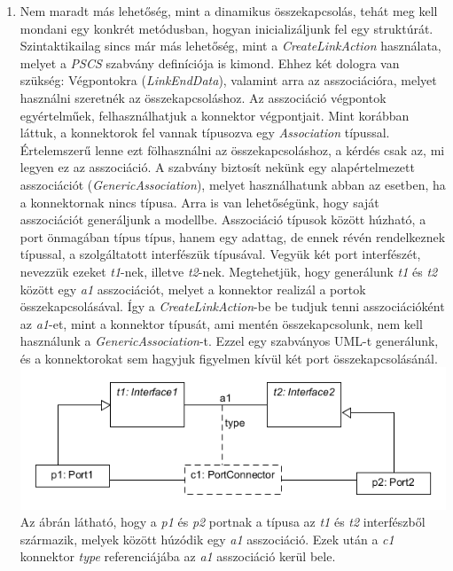 \documentclass[a4paper,12pt]{report}
\begin{document}
\begin{enumerate}
\item Nem maradt más lehetőség, mint a dinamikus összekapcsolás, tehát meg kell mondani egy konkrét metódusban, hogyan inicializáljunk fel egy struktúrát. Szintaktikailag sincs már más lehetőség, mint a \textit{CreateLinkAction} használata, melyet a \textit{PSCS} szabvány definíciója is kimond. Ehhez két dologra van szükség: Végpontokra (\textit{LinkEndData}), valamint arra az asszociációra, melyet használni szeretnék az összekapcsoláshoz. Az asszociáció végpontok egyértelműek, felhasználhatjuk a konnektor végpontjait. Mint korábban láttuk, a konnektorok fel vannak típusozva egy \textit{Association} típussal. Értelemszerű lenne ezt fölhasználni az összekapcsoláshoz, a kérdés csak az, mi legyen ez az asszociáció. A szabvány biztosít nekünk egy alapértelmezett asszociációt (\textit{GenericAssociation}), melyet használhatunk abban az esetben, ha a konnektornak nincs típusa. Arra is van lehetőségünk, hogy saját asszociációt generáljunk a modellbe. Asszociáció típusok között húzható, a port önmagában típus típus, hanem egy adattag, de ennek révén rendelkeznek típussal, a szolgáltatott interfészük típusával. Vegyük két port interfészét, nevezzük ezeket \textit{t1}-nek, illetve \textit{t2}-nek.  Megtehetjük, hogy generálunk \textit{t1} és \textit{t2} között egy \textit{a1} asszociációt, melyet a konnektor realizál a portok összekapcsolásával. Így a \textit{CreateLinkAction}-be be tudjuk tenni asszociációként az \textit{a1}-et, mint a konnektor típusát, ami mentén összekapcsolunk, nem kell használunk a \textit{GenericAssociation}-t. Ezzel egy szabványos UML-t generálunk, és a konnektorokat sem hagyjuk figyelmen kívül két port összekapcsolásánál. \\
\includegraphics[scale=0.8]{connect_type.png}
Az ábrán látható, hogy a \textit{p1} és \textit{p2} portnak a típusa az \textit{t1} és \textit{t2} interfészből származik, melyek között húzódik egy \textit{a1} asszociáció. Ezek után a \textit{c1} konnektor \textit{type} referenciájába az \textit{a1} asszociáció kerül bele. 
\end{enumerate}
\end{document}
